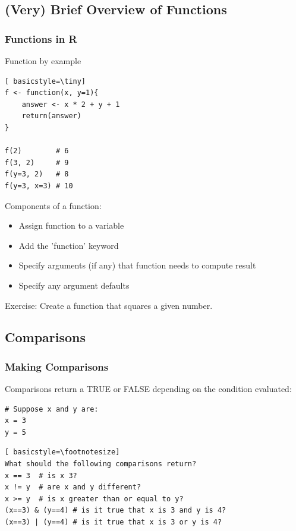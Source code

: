 \subsection{(Very) Brief Overview of Functions}
\begin{frame}
	\frametitle{Functions in R}
	\vspace{-15pt}
	\begin{center}
		\begin{block}{Function by example}
			\begin{lstlisting}[ basicstyle=\tiny]
f <- function(x, y=1){
	answer <- x * 2 + y + 1
	return(answer)
}

f(2)        # 6
f(3, 2)     # 9
f(y=3, 2)   # 8
f(y=3, x=3) # 10
			\end{lstlisting}	
		\end{block}

		\vspace{-5pt}
		\begin{block}{Components of a function:}
			\begin{itemize}
				\item Assign function to a variable
				\item Add the 'function' keyword
				\item Specify arguments (if any) that function needs to compute result
				\item Specify any argument defaults
			\end{itemize}
		\end{block}
	\end{center} 

\newpage
	\begin{alertblock}{Exercise:}
		Create a function that squares a given number.
	\end{alertblock}

\end{frame}

\subsection{Comparisons}
\begin{frame}[fragile]
\frametitle{Making Comparisons}
Comparisons return a TRUE or FALSE depending on the condition evaluated:
			\begin{lstlisting}
# Suppose x and y are:
x = 3
y = 5
			\end{lstlisting}
			\begin{lstlisting}[ basicstyle=\footnotesize]
What should the following comparisons return?
x == 3  # is x 3?
x != y  # are x and y different?
x >= y  # is x greater than or equal to y?
(x==3) & (y==4) # is it true that x is 3 and y is 4?
(x==3) | (y==4) # is it true that x is 3 or y is 4?
			\end{lstlisting}	
\end{frame}

